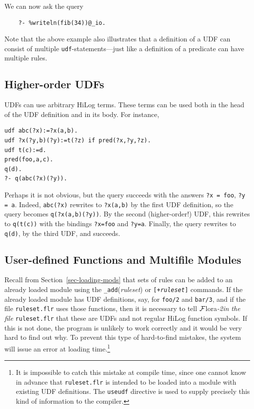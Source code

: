 \documentclass[11pt]{article}
\newcommand{\FLORA}{{\mbox{\sc ${\cal F}${lora}\rm\emph{-2}}}\xspace}
\begin{document}
We can now ask the query
\begin{verbatim}
    ?- %writeln(fib(34))@_io.
\end{verbatim}
Note that the above example also illustrates that a definition of a UDF can
consist of multiple \texttt{udf}-statements---just like a definition
of a predicate can have multiple rules. 

\subsection{Higher-order UDFs}

UDFs can use arbitrary HiLog terms. These terms can be used both in the
head of the UDF definition and in its body. For instance,
\begin{verbatim}
udf abc(?x):=?x(a,b).
udf ?x(?y,b)(?y):=t(?z) if pred(?x,?y,?z).
udf t(c):=d.
pred(foo,a,c).
q(d).
?- q(abc(?x)(?y)).
\end{verbatim}
Perhaps it is not obvious, but the query succeeds
with the answers \texttt{?x = foo}, \texttt{?y = a}.    
Indeed, \texttt{abc(?x)} rewrites to \texttt{?x(a,b)}
by the first UDF definition, so the query becomes
\texttt{q(?x(a,b)(?y))}. By the second (higher-order!) UDF, this rewrites to
\texttt{q(t(c))} with the bindings \texttt{?x=foo} and \texttt{?y=a}.
Finally, the query rewrites to \texttt{q(d)}, by the third UDF, and succeeds. 

\subsection{User-defined Functions and Multifile Modules}

Recall from Section~\ref{sec-loading-mods} that sets of rules can be added to 
an already loaded module using the \texttt{\_add}(\emph{ruleset})
or \texttt{[+\textnormal{\emph{ruleset}}]}
commands.  
If the already loaded module has UDF definitions, say, for \texttt{foo/2}
and \texttt{bar/3}, and if 
the file \texttt{ruleset.flr} uses those functions, then it is necessary to
tell \FLORA \emph{in the file}   \texttt{ruleset.flr} that these are UDFs and not regular HiLog
function symbols. If this is not done, the program is unlikely to work
correctly and it would be very hard to find out why.
To prevent this type of hard-to-find mistakes, the system
will issue an error at loading time.\footnote{
  It is impossible to catch this mistake at compile time, since one
  cannot know in advance that \texttt{ruleset.flr} is intended to
  be loaded into a module with existing UDF definitions.
  The \texttt{useudf} directive is used to supply precisely this kind
  of information to the compiler.
  }
\end{document}

